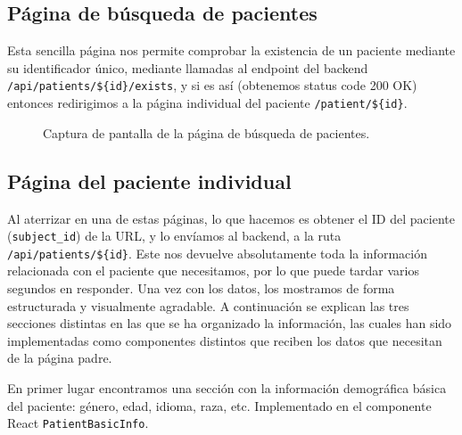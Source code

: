 \subsection{Página de búsqueda de pacientes}
Esta sencilla página nos permite comprobar la existencia de un paciente mediante su identificador único, mediante llamadas al endpoint del backend \texttt{/api/patients/\$\{id\}/exists}, y si es así (obtenemos status code 200 OK) entonces redirigimos a la página individual del paciente \texttt{/patient/\$\{id\}}. 
\begin{figure}[H]
  \centering
  \caption{Captura de pantalla de la página de búsqueda de pacientes.}
  \label{fig:search}
\end{figure}

\subsection{Página del paciente individual}
Al aterrizar en una de estas páginas, lo que hacemos es obtener el ID del paciente (\texttt{subject\_id}) de la URL, y lo envíamos al backend, a la ruta \texttt{/api/patients/\$\{id\}}. Este nos devuelve absolutamente toda la información relacionada con el paciente que necesitamos, por lo que puede tardar varios segundos en responder. Una vez con los datos, los mostramos de forma estructurada y visualmente agradable. A continuación se explican las tres secciones distintas en las que se ha organizado la información, las cuales han sido implementadas como componentes distintos que reciben los datos que necesitan de la página padre.

En primer lugar encontramos una sección con la información demográfica básica del paciente: género, edad, idioma, raza, etc. Implementado en el componente React \texttt{PatientBasicInfo}.

